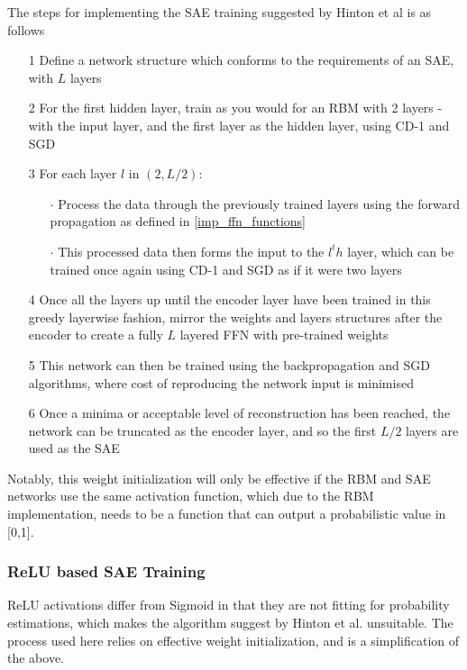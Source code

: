 \documentclass[a4paper,11pt,oneside]{article}
\theoremstyle{plain}
\theoremstyle{definition}
\begin{document}
The steps for implementing the SAE training suggested by Hinton et al \cite{Hinton2} is as follows

\begin{itemize}
	\item [1] Define a network structure which conforms to the requirements of an SAE, with $L$ layers
	\item [2] For the first hidden layer, train as you would for an RBM with 2 layers - with the input layer, and the first layer as the hidden layer, using CD-1 and SGD
	\item [3] For each layer $l$ in $(2, L/2)$:
	\begin{itemize}
		\item [$\cdot$] Process the data through the previously trained layers using the forward propagation as defined in \ref{imp_ffn_functions}
		\item [$\cdot$] This processed data then forms the input to the $l^th$ layer, which can be trained once again using CD-1 and SGD as if it were two layers
	\end{itemize}
	\item[4] Once all the layers up until the encoder layer have been trained in this greedy layerwise fashion, mirror the weights and layers structures after the encoder to create a fully $L$ layered FFN with pre-trained weights
	\item [5] This network can then be trained using the backpropagation and SGD algorithms, where cost of reproducing the network input is minimised
	\item [6] Once a minima or acceptable level of reconstruction has been reached, the network can be truncated as the encoder layer, and so the first $L/2$ layers are used as the SAE
\end{itemize}

Notably, this weight initialization will only be effective if the RBM and SAE networks use the same activation function, which due to the RBM implementation, needs to be a function that can output a probabilistic value in [0,1].

\subsubsection{ReLU based SAE Training}\label{imp_relusae}

ReLU activations differ from Sigmoid in that they are not fitting for probability estimations, which makes the algorithm suggest by Hinton et al. unsuitable. The process used here relies on effective weight initialization, and is a simplification of the above.
\end{document}

